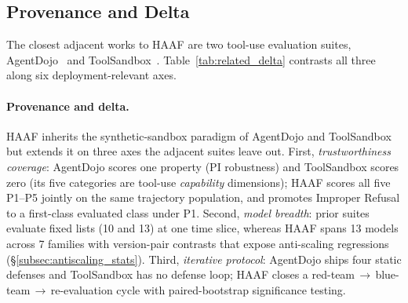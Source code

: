 \subsection{Provenance and Delta}
\label{subsec:provenance_delta}

The closest adjacent works to HAAF are two tool-use evaluation suites, AgentDojo~\cite{debenedetti2024agentdojo} and ToolSandbox~\cite{lu2024toolsandbox}. Table~\ref{tab:related_delta} contrasts all three along six deployment-relevant axes.

\begin{table}[!htbp]
\centering
\caption{Adjacent tool-use benchmarks vs.\ HAAF. ``Props'' = deployment-level trustworthiness properties (P1--P5) explicitly scored; ``R/B Cycle'' = iterative red-team$\,\to\,$blue-team$\,\to\,$re-evaluation loop; ``IR'' = Improper Refusal as a first-class evaluated class. PI = prompt injection; fams.\ = families; dom.\ = domains; L4 = Layer-4 subset-selected.}
\label{tab:related_delta}
\small
\setlength{\tabcolsep}{3pt}
\end{table}

\paragraph{Provenance and delta.}
HAAF inherits the synthetic-sandbox paradigm of AgentDojo and ToolSandbox but extends it on three axes the adjacent suites leave out. First, \emph{trustworthiness coverage}: AgentDojo scores one property (PI robustness) and ToolSandbox scores zero (its five categories are tool-use \emph{capability} dimensions); HAAF scores all five P1--P5 jointly on the same trajectory population, and promotes Improper Refusal to a first-class evaluated class under P1. Second, \emph{model breadth}: prior suites evaluate fixed lists (10 and 13) at one time slice, whereas HAAF spans 13 models across 7 families with version-pair contrasts that expose anti-scaling regressions (\S\ref{subsec:antiscaling_stats}). Third, \emph{iterative protocol}: AgentDojo ships four static defenses and ToolSandbox has no defense loop; HAAF closes a red-team$\,\to\,$blue-team$\,\to\,$re-evaluation cycle with paired-bootstrap significance testing.
